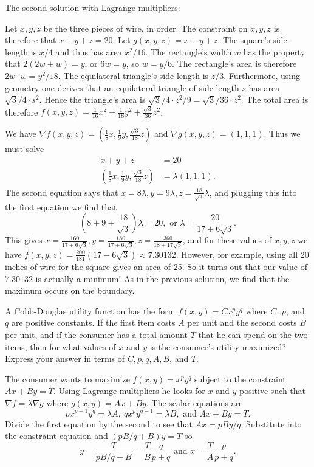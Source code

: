 \begin{solution}
  The second solution with Lagrange multipliers:

  Let $x,y,z$ be the three pieces of wire, in order. The constraint on $x,y,z$ is therefore that $x+y+z=20$. Let $g(x,y,z)=x+y+z$. The square's side length is $x/4$ and thus has area $x^2/16$. The rectangle's width $w$ has the property that $2(2w+w)=y$, or $6w=y$, so $w=y/6$. The rectangle's area is therefore $2w\cdot w=y^2/18$. The equilateral triangle's side length is $z/3$. Furthermore, using geometry one derives that an equilateral triangle of side length $s$ has area $\sqrt3/4\cdot s^2$. Hence the triangle's area is $\sqrt3/4\cdot z^2/9=\sqrt3/36\cdot z^2$. The total area is therefore $f(x,y,z)=\frac1{16}x^2+\frac1{18}y^2+\frac{\sqrt3}{36}z^2$.

  We have $\nabla f(x,y,z)=(\frac18x, \frac19y,\frac{\sqrt3}{18}z)$ and $\nabla g(x,y,z)=(1,1,1)$. Thus we must solve
  \begin{align*}
    x+y+z &= 20\\
    \left(\frac18x, \frac19y,\frac{\sqrt3}{18}z\right) &= \lambda(1,1,1).
  \end{align*}
  The second equation says that $x=8\lambda,y=9\lambda,z=\frac{18}{\sqrt3}\lambda$, and plugging this into the first equation we find that
  \[\left(8+9+\frac{18}{\sqrt3}\right)\lambda=20,\text{ or }\lambda=\frac{20}{17+6\sqrt3}.\]
  This gives $x=\frac{160}{17+6\sqrt3},y=\frac{180}{17+6\sqrt3},z=\frac{360}{18+17\sqrt3}$, and for these values of $x,y,z$ we have $f(x,y,z)=\frac{200}{181}(17-6\sqrt3)\approx 7.30132$. However, for example, using all 20 inches of wire for the square gives an area of 25. So it turns out that our value of $7.30132$ is actually a minimum! As in the previous solution, we find that the maximum occurs on the boundary.
\end{solution}

\begin{problem}
  A Cobb-Douglas utility function has the form $f(x,y) = Cx^py^q$ where $C$, $p$, and $q$ are positive constants. If the first item costs $A$ per unit and the second costs $B$ per unit, and if the consumer has a total amount $T$ that he can spend on the two items, then for what values of $x$ and $y$ is the consumer's utility maximized? Express your answer in terms of $C,p,q,A,B$, and $T$.
\end{problem}
\begin{solution}
  The consumer wants to maximize $f(x,y)=x^py^q$ subject to the constraint $Ax+By=T$. Using Lagrange multipliers he looks for $x$ and $y$ positive such that $\nabla f=\lambda\nabla g$ where $g(x,y)=Ax+By$. The scalar equations are
  \[px^{p-1}y^q=\lambda A,\ qx^py^{q-1}=\lambda B,\text{ and }Ax+By=T.\]
  Divide the first equation by the second to see that $Ax=pBy/q$. Substitute into the constraint equation and $(pB/q+B)y=T$ so
  \[y=\frac T{pB/q+B}=\frac TB\frac q{p+q}\text{ and }x=\frac TA\frac p{p+q}.\]
\end{solution}

